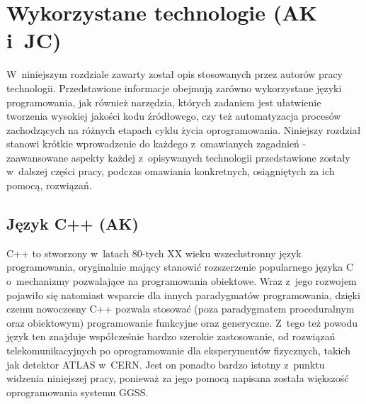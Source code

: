 \chapter{Wykorzystane technologie (AK i~JC)}
\label{ch:technologies}

\graphicspath{{2_technologies/static/}}

W~niniejszym rozdziale zawarty został opis stosowanych przez autorów pracy technologii. Przedstawione informacje obejmują zarówno wykorzystane języki programowania, jak również narzędzia, których zadaniem jest ułatwienie tworzenia wysokiej jakości kodu źródłowego, czy też automatyzacja procesów zachodzących na różnych etapach cyklu życia oprogramowania. Niniejszy rozdział stanowi krótkie wprowadzenie do każdego z~omawianych zagadnień - zaawansowane aspekty każdej z~opisywanych technologii przedstawione zostały w~dalszej części pracy, podczas omawiania konkretnych, osiągniętych za ich pomocą, rozwiązań. 


\section{Język C++ (AK)}
C++ \cite{Bjarne} \cite{cpp_reference} to stworzony w~latach 80-tych XX wieku wszechstronny język programowania, oryginalnie mający stanowić rozszerzenie popularnego języka C~\cite{c_book} o~mechanizmy pozwalające na programowania obiektowe. Wraz z~jego rozwojem pojawiło się natomiast wsparcie dla innych paradygmatów programowania, dzięki czemu nowoczesny C++ pozwala stosować (poza paradygmatem proceduralnym oraz obiektowym) programowanie funkcyjne oraz generyczne. Z~tego też powodu język ten znajduje współcześnie bardzo szerokie zastosowanie, od rozwiązań telekomunikacyjnych po oprogramowanie dla eksperymentów fizycznych, takich jak detektor ATLAS w~CERN. Jest on ponadto bardzo istotny z~punktu widzenia niniejszej pracy, ponieważ za jego pomocą napisana została większość oprogramowania systemu GGSS.

